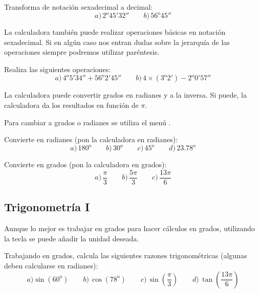 \documentclass[12pt]{article}
\newcommand{\casiosymbol}[1]{{\footnotesize\casio\symbol{#1}}}
\newcommand{\casiusymbol}[1]{{\footnotesize\casiu\symbol{#1}}}
\newenvironment{capitulo}{\begin{tcolorbox}[colback=blue!5!white,colframe=red!75!black]}{\end{tcolorbox}\bigskip}
\newenvironment{ejer}{\begin{tcolorbox}[center title, 
fonttitle=\sffamily\bfseries,colback=blue!5,colframe=orange]}{\end{tcolorbox}}
\begin{document}
\begin{ejer}

Transforma de notación sexadecimal a decimal:
\[
a)\, 2^\mathrm{o} 45' 32'' \qquad b)\,56^\mathrm{o} 45''
\]

\end{ejer}

La calculadora también puede realizar operaciones básicas en notación sexadecimal. Si en algún caso nos entran dudas sobre la jerarquía de las operaciones siempre podremos utilizar paréntesis.

\begin{ejer}
Realiza las siguientes operaciones:
\[
a)\, 4^\text{o} 5' 34'' + 56^\text{o} 2'45'' \qquad b) \, 4\times(3^\text{o} 2')-2^\text{o} 0'57''
\]

\end{ejer}

La calculadora puede convertir grados en radianes y a la inversa. Si puede, la calculadora da los resultados en función de $\pi$.

Para cambiar a grados o radianes se utiliza el menú \casiusymbol{47}.

\begin{ejer}

Convierte en radianes (pon la calculadora en radianes):
\[
a)\, 180^\mathrm{o}\qquad b)\, 30^\mathrm{o}\qquad c)\, 45^\mathrm{o} \qquad d)\, 23.78^\mathrm{o}
\]

\end{ejer}

\begin{ejer}

Convierte en grados (pon la calculadora en grados):
\[
a)\, \frac{\pi}{3}\qquad b)\, \frac{5\pi}{3} \qquad c)\, \frac{13\pi}{6}
\]

\end{ejer}

\newpage

\begin{capitulo}
\section*{Trigonometría I}
\end{capitulo}


Aunque lo mejor es trabajar en grados para hacer cálculos en grados, utilizando la tecla \casiosymbol{84} se puede añadir la unidad deseada.

\begin{ejer}

Trabajando en grados, calcula las siguientes razones trigonométricas (algunas deben calcularse en radianes):
\[
a)\sin(60^\mathrm{o}) \qquad b)\, \cos(78^\mathrm{o}) \qquad c)\, \sin\left(\frac{\pi}{3}\right)\qquad d)\,\tan\left(\frac{13\pi}{6}\right)
\]

\end{ejer}
\end{document}
